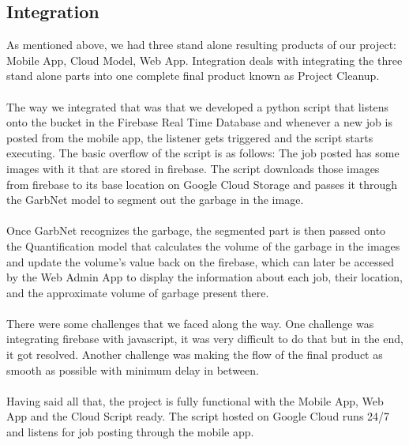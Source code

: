 \subsection{Integration}
As mentioned above, we had three stand alone resulting products of our project: Mobile App, Cloud Model, Web App. Integration deals with integrating the three stand alone parts into one complete final product known as Project Cleanup. \\
\\
The way we integrated that was that we developed a python script that listens onto the bucket in the Firebase Real Time Database and whenever a new job is posted from the mobile app, the listener gets triggered and the script starts executing. The basic overflow of the script is as follows: The job posted has some images with it that are stored in firebase. The script downloads those images from firebase to its base location on Google Cloud Storage and passes it through the GarbNet model to segment out the garbage in the image.\\
\\
Once GarbNet recognizes the garbage, the segmented part is then passed onto the Quantification model that calculates the volume of the garbage in the images and update the volume's value back on the firebase, which can later be accessed by the Web Admin App to display the information about each job, their location, and the approximate volume of garbage present there.\\
\\
There were some challenges that we faced along the way. One challenge was integrating firebase with javascript, it was very difficult to do that but in the end, it got resolved. Another challenge was making the flow of the final product as smooth as possible with minimum delay in between.\\
\\
Having said all that, the project is fully functional with the Mobile App, Web App and the Cloud Script ready. The script hosted on Google Cloud runs 24/7 and listens for job posting through the mobile app.